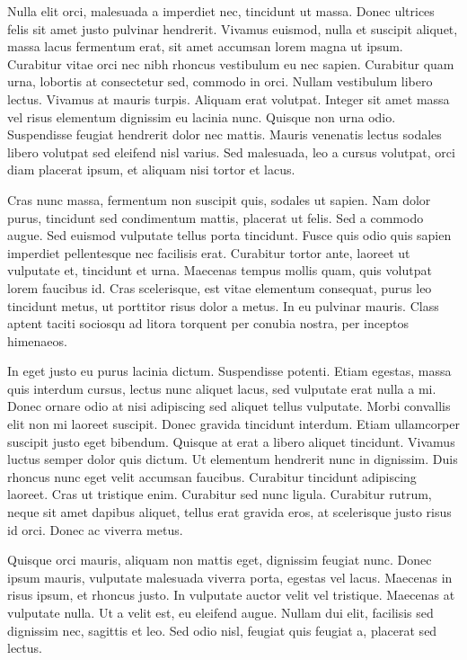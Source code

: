 \documentclass[12pt,lot,lof]{quthesis}
\begin{document}
Nulla elit orci, malesuada a imperdiet nec, tincidunt ut massa. Donec ultrices felis sit amet justo pulvinar hendrerit. Vivamus euismod, nulla et suscipit aliquet, massa lacus fermentum erat, sit amet accumsan lorem magna ut ipsum. Curabitur vitae orci nec nibh rhoncus vestibulum eu nec sapien. Curabitur quam urna, lobortis at consectetur sed, commodo in orci. Nullam vestibulum libero lectus. Vivamus at mauris turpis. Aliquam erat volutpat. Integer sit amet massa vel risus elementum dignissim eu lacinia nunc. Quisque non urna odio. Suspendisse feugiat hendrerit dolor nec mattis. Mauris venenatis lectus sodales libero volutpat sed eleifend nisl varius. Sed malesuada, leo a cursus volutpat, orci diam placerat ipsum, et aliquam nisi tortor et lacus.

Cras nunc massa, fermentum non suscipit quis, sodales ut sapien. Nam dolor purus, tincidunt sed condimentum mattis, placerat ut felis. Sed a commodo augue. Sed euismod vulputate tellus porta tincidunt. Fusce quis odio quis sapien imperdiet pellentesque nec facilisis erat. Curabitur tortor ante, laoreet ut vulputate et, tincidunt et urna. Maecenas tempus mollis quam, quis volutpat lorem faucibus id. Cras scelerisque, est vitae elementum consequat, purus leo tincidunt metus, ut porttitor risus dolor a metus. In eu pulvinar mauris. Class aptent taciti sociosqu ad litora torquent per conubia nostra, per inceptos himenaeos.

In eget justo eu purus lacinia dictum. Suspendisse potenti. Etiam egestas, massa quis interdum cursus, lectus nunc aliquet lacus, sed vulputate erat nulla a mi. Donec ornare odio at nisi adipiscing sed aliquet tellus vulputate. Morbi convallis elit non mi laoreet suscipit. Donec gravida tincidunt interdum. Etiam ullamcorper suscipit justo eget bibendum. Quisque at erat a libero aliquet tincidunt. Vivamus luctus semper dolor quis dictum. Ut elementum hendrerit nunc in dignissim. Duis rhoncus nunc eget velit accumsan faucibus. Curabitur tincidunt adipiscing laoreet. Cras ut tristique enim. Curabitur sed nunc ligula. Curabitur rutrum, neque sit amet dapibus aliquet, tellus erat gravida eros, at scelerisque justo risus id orci. Donec ac viverra metus.

Quisque orci mauris, aliquam non mattis eget, dignissim feugiat nunc. Donec ipsum mauris, vulputate malesuada viverra porta, egestas vel lacus. Maecenas in risus ipsum, et rhoncus justo. In vulputate auctor velit vel tristique. Maecenas at vulputate nulla. Ut a velit est, eu eleifend augue. Nullam dui elit, facilisis sed dignissim nec, sagittis et leo. Sed odio nisl, feugiat quis feugiat a, placerat sed lectus.
\end{document}
